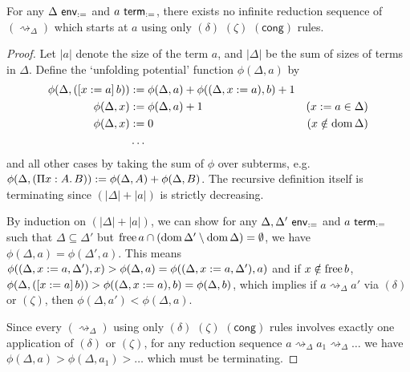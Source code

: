 \documentclass[twoside]{report}
\begin{document}
\begin{proposition}
    \label{thm:def_delta_zeta_termination}
    For any $\Delta \ \mathsf{env}_{:=}$ and $a \ \mathsf{term}_{:=}$, there exists no infinite reduction sequence of $(\rightsquigarrow_\Delta)$ which starts at $a$ using only $(\delta)$ $(\zeta)$ $(\mathsf{cong})$ rules.
\end{proposition}

\begin{proof}
    Let $|a|$ denote the size of the term $a$, and $|\Delta|$ be the sum of sizes of terms in $\Delta$. Define the `unfolding potential' function $\phi(\Delta, a)$ by
    $$
        \begin{aligned}
            \phi(\Delta, ([{x}:={a}]\,{b})) & := \phi(\Delta, a) + \phi((\Delta, x := a), b) + 1                           \\
            \phi(\Delta, x)             & := \phi(\Delta, a) + 1                                 & (x := a \in \Delta) \\
            \phi(\Delta, x)             & := 0                                                   & (x\notin\operatorname{dom}\Delta)     \\
                                        & \ldots
        \end{aligned}
    $$
    and all other cases by taking the sum of $\phi$ over subterms, e.g. $\phi(\Delta, (\Pi{x} : {A}.\,{B})) := \phi(\Delta, A) + \phi(\Delta, B)$. The recursive definition itself is terminating since $(|\Delta| + |a|)$ is strictly decreasing.

    By induction on $(|\Delta| + |a|)$, we can show for any $\Delta, \Delta' \ \mathsf{env}_{:=}$ and $a \ \mathsf{term}_{:=}$ such that $\Delta\subseteq\Delta'$ but $\operatorname{free} a \cap (\operatorname{dom} \Delta' \setminus \operatorname{dom} \Delta) = \emptyset$, we have $\phi(\Delta, a) = \phi(\Delta', a)$. This means $\phi((\Delta, x := a, \Delta'), x) > \phi(\Delta, a) = \phi((\Delta, x := a, \Delta'), a)$ and if $x \notin \operatorname{free} b$, $\phi(\Delta, ([{x}:={a}]\,{b})) > \phi((\Delta, x := a), b) = \phi(\Delta, b)$, which implies if $a \rightsquigarrow_\Delta a'$ via $(\delta)$ or $(\zeta)$, then $\phi(\Delta, a') < \phi(\Delta, a)$.

    Since every $(\rightsquigarrow_\Delta)$ using only $(\delta)$ $(\zeta)$ $(\mathsf{cong})$ rules involves exactly one application of $(\delta)$ or $(\zeta)$, for any reduction sequence $a \rightsquigarrow_\Delta a_1 \rightsquigarrow_\Delta \ldots$ we have $\phi(\Delta, a) > \phi(\Delta, a_1) > \ldots$ which must be terminating.
\end{proof}
\end{document}
